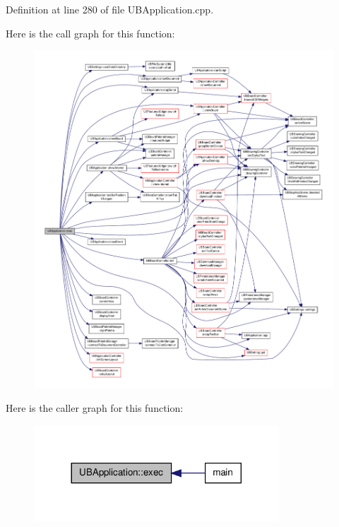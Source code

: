 Definition at line 280 of file U\-B\-Application.\-cpp.



Here is the call graph for this function\-:
\nopagebreak
\begin{figure}[H]
\begin{center}
\leavevmode
\includegraphics[width=350pt]{d8/d81/class_u_b_application_add1469239e71bf24fdc61413a42a38bd_cgraph}
\end{center}
\end{figure}




Here is the caller graph for this function\-:
\nopagebreak
\begin{figure}[H]
\begin{center}
\leavevmode
\includegraphics[width=260pt]{d8/d81/class_u_b_application_add1469239e71bf24fdc61413a42a38bd_icgraph}
\end{center}
\end{figure}


